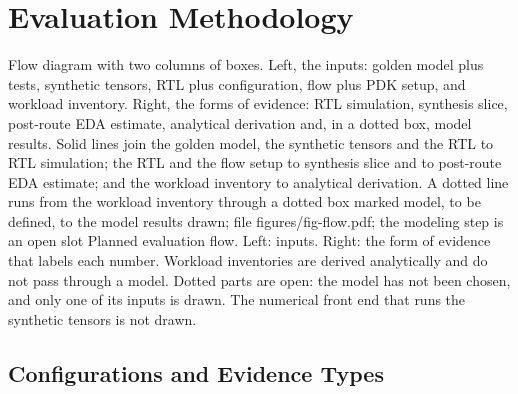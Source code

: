 
\section{Evaluation Methodology}\label{sec:method}

%
  {Flow diagram with two columns of boxes. Left, the inputs: golden model plus tests, synthetic tensors, RTL plus configuration, flow plus PDK setup, and workload inventory. Right, the forms of evidence: RTL simulation, synthesis slice, post-route EDA estimate, analytical derivation and, in a dotted box, model results. Solid lines join the golden model, the synthetic tensors and the RTL to RTL simulation; the RTL and the flow setup to synthesis slice and to post-route EDA estimate; and the workload inventory to analytical derivation. A dotted line runs from the workload inventory through a dotted box marked model, to be defined, to the model results}%
  {drawn; file figures/fig-flow.pdf; the modeling step is an open slot}%
  {Planned evaluation flow. Left: inputs. Right: the form of evidence that labels each number. Workload inventories are derived analytically and do not pass through a model. Dotted parts are open: the model has not been chosen, and only one of its inputs is drawn. The numerical front end that runs the synthetic tensors is not drawn.}

\subsection{Configurations and Evidence Types}\label{sec:configs}

\begin{table}[t]
\centering{}%
\caption{Configurations and forms of evidence.}\label{tab:configs}

\end{table}

